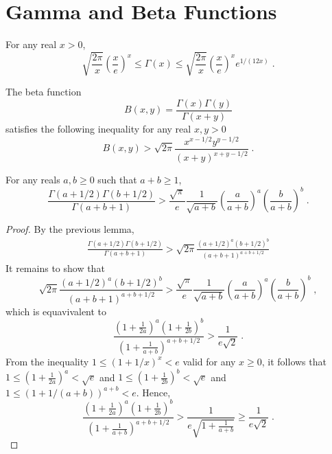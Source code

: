\section{Gamma and Beta Functions}

\begin{lemma}
For any real $x > 0$,
$$
\sqrt{\frac{2\pi}{x}} \left( \frac{x}{e} \right)^x \le \Gamma(x) \le \sqrt{\frac{2\pi}{x}} \left( \frac{x}{e} \right)^x e^{1/(12x)} \; .
$$
\end{lemma}

\begin{lemma}
The beta function
$$
B(x,y) = \frac{\Gamma(x) \Gamma(y)}{\Gamma(x + y)}
$$
satisfies the following inequality for any real $x,y > 0$
$$
B(x,y) > \sqrt{2\pi} \frac{x^{x-1/2} y^{y-1/2}}{(x+y)^{x+y-1/2}} \; .
$$
\end{lemma}


\begin{lemma}
For any reals $a,b \ge 0$ such that $a+b \ge 1$,
$$
\frac{\Gamma(a+1/2)\Gamma(b+1/2)}{\Gamma(a+b+1)} >
\frac{\sqrt{\pi}}{e} \frac{1}{\sqrt{a+b}} \left( \frac{a}{a+b} \right)^a \left( \frac{b}{a+b} \right)^b \; .
$$
\end{lemma}

\begin{proof}
By the previous lemma,
\begin{align*}
\frac{\Gamma(a+1/2)\Gamma(b+1/2)}{\Gamma(a+b+1)}
> \sqrt{2\pi} \frac{(a+1/2)^a (b+1/2)^b}{(a+b+1)^{a+b+1/2}}
\end{align*}
It remains to show that
$$
\sqrt{2\pi} \frac{(a+1/2)^a (b+1/2)^b}{(a+b+1)^{a+b+1/2}} > \frac{\sqrt{\pi}}{e} \frac{1}{\sqrt{a+b}} \left( \frac{a}{a+b} \right)^a \left( \frac{b}{a+b} \right)^b \; ,
$$
which is equavivalent to
$$
\frac{(1+\frac{1}{2a})^a (1+\frac{1}{2b})^b}{(1+\frac{1}{a+b})^{a+b+1/2}} > \frac{1}{e\sqrt{2}} \; .
$$
From the inequality $1 \le (1+1/x)^x < e$ valid for any $x \ge 0$, it follows
that $1 \le (1+\frac{1}{2a})^a < \sqrt{e}$ and $1 \le (1+\frac{1}{2b})^b < \sqrt{e}$
and $1 \le (1+1/(a+b))^{a+b} < e$. Hence,
$$
\frac{(1+\frac{1}{2a})^a (1+\frac{1}{2b})^b}{(1+\frac{1}{a+b})^{a+b+1/2}}
> \frac{1}{e \sqrt{1 + \frac{1}{a+b}}}
\ge \frac{1}{e \sqrt{2}} \; .
$$

\end{proof}
